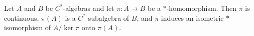 Let $A$ and $B$ be $C^*$-algebras and let $\pi: A \to B$ be a $\ast$-homomorphism. Then $\pi$ is continuous, $\pi(A)$ is a $C^*$-subalgebra of $B$, and $\pi$ induces an isometric $\ast$-isomorphism of $A/\ker\pi$ onto $\pi(A)$.
